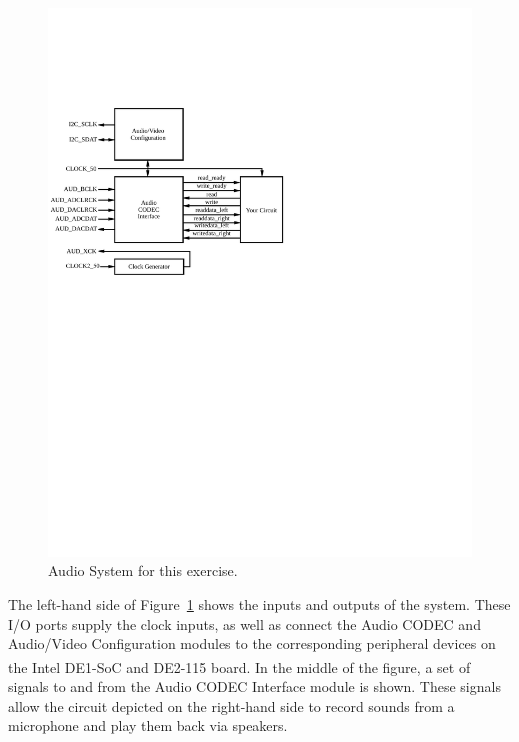 \documentclass[epsfig,10pt,fullpage]{article}
\begin{document}
\begin{figure}[H]
\centering
\includegraphics{figures/audio_system.pdf}
\caption{Audio System for this exercise.}
\label{fig:audio_system}
\end{figure}

The left-hand side of Figure~\ref{fig:audio_system} shows the inputs and outputs of the system. These I/O ports
supply the clock inputs, as well as connect the {\sf Audio CODEC} and {\sf Audio/Video Configuration} modules to the corresponding
peripheral devices on the Intel\textsuperscript{\textregistered} DE1-SoC and DE2-115 board. In the middle of the figure, a set 
of signals to and from the {\sf Audio CODEC Interface} module is shown. These signals 
allow the circuit depicted on the right-hand side to record sounds from a microphone and 
play them back via speakers.
\end{document}
